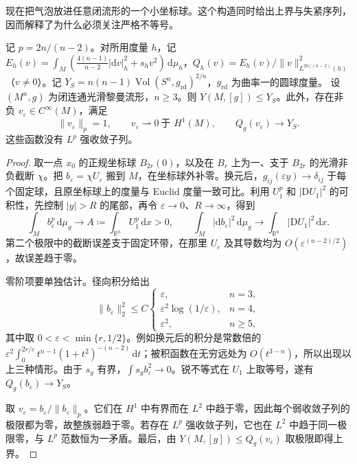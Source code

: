 现在把气泡放进任意闭流形的一个小坐标球。这个构造同时给出上界与失紧序列，因而解释了为什么必须关注严格不等号。
\begin{proposition}\label{g3:prop:yamabe-bubble-upper-bound}
	记 \(p=2n/(n-2)\)。对所用度量 \(h\)，记 \(E_h(v)=\int_M(\tfrac{4(n-1)}{n-2}|\mathrm dv|_h^2+s_hv^2)\,\mathrm d\mu_h\)，\(Q_h(v)=E_h(v)/\|v\|_{L^{2n/(n-2)}(h)}^2\)（\(v\ne0\)）。记 \(Y_S=n(n-1)\operatorname{Vol}(S^n,g_{\mathrm{rd}})^{2/n}\)，\(g_{\mathrm{rd}}\) 为曲率一的圆球度量。
	设 \((M^n,g)\) 为闭连通光滑黎曼流形，\(n\ge3\)。则 \(Y(M,[g])\le Y_S\)。此外，存在非负 \(v_\varepsilon\in C^\infty(M)\)，满足
	\[
		\|v_\varepsilon\|_p=1,\qquad
		v_\varepsilon\rightharpoonup0\ \text{于 }H^1(M),\qquad
		Q_g(v_\varepsilon)\longrightarrow Y_S.
	\]
	这些函数没有 \(L^p\) 强收敛子列。
\end{proposition}
\begin{proof}
	取一点 \(x_0\) 的正规坐标球 \(B_{2r}(0)\)，以及在 \(B_r\) 上为一、支于 \(B_{2r}\) 的光滑非负截断 \(\chi\)。把 \(b_\varepsilon=\chi U_\varepsilon\) 搬到 \(M\)，在坐标球外补零。换元后，\(g_{ij}(\varepsilon y)\to\delta_{ij}\) 于每个固定球，且原坐标球上的度量与 Euclid 度量一致可比。利用 \(U_1^p\) 和 \(|\mathrm DU_1|^2\) 的可积性，先控制 \(|y|>R\) 的尾部，再令 \(\varepsilon\to0\)、\(R\to\infty\)，得到
	\[
		\int_M b_\varepsilon^p\,\mathrm d\mu_g\longrightarrow
		A\coloneqq\int_{\mathbb R^n}U_1^p\,\mathrm dx>0,
	\qquad
		\int_M|\mathrm db_\varepsilon|^2\,\mathrm d\mu_g
		\longrightarrow\int_{\mathbb R^n}|\mathrm DU_1|^2\,\mathrm dx.
	\]
	第二个极限中的截断误差支于固定环带，在那里 \(U_\varepsilon\) 及其导数均为 \(O(\varepsilon^{(n-2)/2})\)，故误差趋于零。

	零阶项要单独估计。径向积分给出
	\begin{equation}\label{g3:eq:yamabe-bubble-l2}
		\|b_\varepsilon\|_2^2\le C
		\begin{cases}
			\varepsilon,&n=3,\\
			\varepsilon^2\log(1/\varepsilon),&n=4,\\
			\varepsilon^2,&n\ge5,
		\end{cases}
	\end{equation}
	其中取 \(0<\varepsilon<\min\{r,1/2\}\)。例如换元后的积分是常数倍的
	\(\varepsilon^2\int_0^{2r/\varepsilon}t^{n-1}(1+t^2)^{-(n-2)}\,\mathrm dt\)；被积函数在无穷远处为 \(O(t^{3-n})\)，所以出现以上三种情形。由于 \(s_g\) 有界，\(\int s_gb_\varepsilon^2\to0\)。锐不等式在 \(U_1\) 上取等号，遂有 \(Q_g(b_\varepsilon)\to Y_S\)。

	取 \(v_\varepsilon=b_\varepsilon/\|b_\varepsilon\|_p\)。它们在 \(H^1\) 中有界而在 \(L^2\) 中趋于零，因此每个弱收敛子列的极限都为零，故整族弱趋于零。若存在 \(L^p\) 强收敛子列，它也在 \(L^2\) 中趋于同一极限零，与 \(L^p\) 范数恒为一矛盾。最后，由 \(Y(M,[g])\le Q_g(v_\varepsilon)\) 取极限即得上界。
\end{proof}

